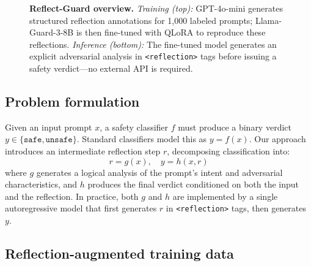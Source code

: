 \documentclass[11pt]{article}
\begin{document}
\begin{figure}[t]
\caption{
\textbf{Reflect-Guard overview.}
\textit{Training (top):} GPT-4o-mini generates structured reflection annotations for 1{,}000 labeled prompts; Llama-Guard-3-8B is then fine-tuned with QLoRA to reproduce these reflections.
\textit{Inference (bottom):} The fine-tuned model generates an explicit adversarial analysis in \texttt{<reflection>} tags before issuing a safety verdict—no external API is required.
}
\label{fig:pipeline}
\end{figure}

\subsection{Problem formulation}

Given an input prompt $x$, a safety classifier $f$ must produce a binary verdict $y \in \{\texttt{safe}, \texttt{unsafe}\}$. Standard classifiers model this as $y = f(x)$. Our approach introduces an intermediate reflection step $r$, decomposing classification into:
\begin{equation}
  r = g(x), \quad y = h(x, r)
\end{equation}
where $g$ generates a logical analysis of the prompt's intent and adversarial characteristics, and $h$ produces the final verdict conditioned on both the input and the reflection. In practice, both $g$ and $h$ are implemented by a single autoregressive model that first generates $r$ in \texttt{<reflection>} tags, then generates $y$.

\subsection{Reflection-augmented training data}
\label{sec:synthesis}
\end{document}
